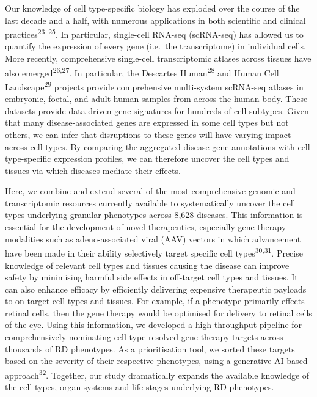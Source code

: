 \documentclass[
]{article}
\begin{document}
Our knowledge of cell type-specific biology has exploded over the course
of the last decade and a half, with numerous applications in both
scientific and clinical practices\textsuperscript{23--25}. In
particular, single-cell RNA-seq (scRNA-seq) has allowed us to quantify
the expression of every gene (i.e.~the transcriptome) in individual
cells. More recently, comprehensive single-cell transcriptomic atlases
across tissues have also emerged\textsuperscript{26,27}. In particular,
the Descartes Human\textsuperscript{28} and Human Cell
Landscape\textsuperscript{29} projects provide comprehensive
multi-system scRNA-seq atlases in embryonic, foetal, and adult human
samples from across the human body. These datasets provide data-driven
gene signatures for hundreds of cell subtypes. Given that many
disease-associated genes are expressed in some cell types but not
others, we can infer that disruptions to these genes will have varying
impact across cell types. By comparing the aggregated disease gene
annotations with cell type-specific expression profiles, we can
therefore uncover the cell types and tissues via which diseases mediate
their effects.

Here, we combine and extend several of the most comprehensive genomic
and transcriptomic resources currently available to systematically
uncover the cell types underlying granular phenotypes across 8,628
diseases. This information is essential for the development of novel
therapeutics, especially gene therapy modalities such as
adeno-associated viral (AAV) vectors in which advancement have been made
in their ability selectively target specific cell
types\textsuperscript{30,31}. Precise knowledge of relevant cell types
and tissues causing the disease can improve safety by minimising harmful
side effects in off-target cell types and tissues. It can also enhance
efficacy by efficiently delivering expensive therapeutic payloads to
on-target cell types and tissues. For example, if a phenotype primarily
effects retinal cells, then the gene therapy would be optimised for
delivery to retinal cells of the eye. Using this information, we
developed a high-throughput pipeline for comprehensively nominating cell
type-resolved gene therapy targets across thousands of RD phenotypes. As
a prioritisation tool, we sorted these targets based on the severity of
their respective phenotypes, using a generative AI-based
approach\textsuperscript{32}. Together, our study dramatically expands
the available knowledge of the cell types, organ systems and life stages
underlying RD phenotypes.
\end{document}
